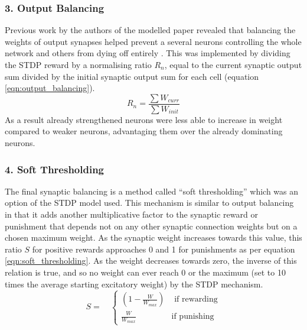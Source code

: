 \documentclass[11pt, twocolumn]{article}
\begin{document}
\subsubsection*{3. Output Balancing}
Previous work by the authors of the modelled paper revealed that balancing the weights of output synapses helped prevent a several neurons controlling the whole network and others from dying off entirely \cite{skorheim2014spiking}. This was implemented by dividing the \acs{STDP} reward by a normalising ratio $R_n$, equal to the current synaptic output sum divided by the initial synaptic output sum for each cell (equation \ref{eqn:output_balancing}).
\begin{equation}
	R_n = \frac{\sum W_{curr}}{\sum W_{init}}
	\label{eqn:output_balancing}
\end{equation}
As a result already strengthened neurons were less able to increase in weight compared to weaker neurons, advantaging them over the already dominating neurons.

\subsubsection*{4. Soft Thresholding}
The final synaptic balancing is a method called ``soft thresholding'' which was an option of the \acs{STDP} model used. This mechanism is similar to output balancing in that it adds another multiplicative factor to the synaptic reward or punishment that depends not on any other synaptic connection weights but on a chosen maximum weight. As the synaptic weight increases towards this value, this ratio $S$ for positive rewards approaches 0 and 1 for punishments as per equation \ref{eqn:soft_thresholding}. As the weight decreases towards zero, the inverse of this relation is true, and so no weight can ever reach 0 or the maximum (set to 10 times the average starting excitatory weight) by the \acs{STDP} mechanism.
\begin{equation}
	S = \quad
	\begin{cases} 
	\left(1-\frac{W}{W_{max}}\right) & \text{ if rewarding} \\
	\frac{W}{W_{max}} & \text{if punishing}
	\end{cases}
	\label{eqn:soft_thresholding}
\end{equation}
\end{document}

